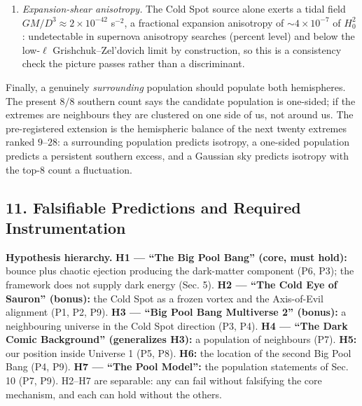 \documentclass[
]{article}
\begin{document}
\begin{enumerate}
  the sign convention (hot attractive) gives \((290°, -24°)\), \(19°\)
  from CF4. The model therefore either fails this test or requires hot
  extremes to be the attractive ones, which is the unspecified sign
  mechanism noted under the table above. We pre-register the test as:
  once the sign mechanism is fixed \emph{by the model}, the predicted
  direction must fall within \(30°\) of the measured bulk flow; the sign
  may not be chosen from the data.
\item
  \emph{Expansion-shear anisotropy.} The Cold Spot source alone exerts a
  tidal field \(GM/D^3 \approx 2\times10^{-42}\) s\(^{-2}\), a
  fractional expansion anisotropy of \(\sim\!4\times10^{-7}\) of
  \(H_0^2\): undetectable in supernova anisotropy searches (percent
  level) and below the low-\(\ell\) Grishchuk--Zel'dovich limit by
  construction, so this is a consistency check the picture passes rather
  than a discriminant.
\end{enumerate}

Finally, a genuinely \emph{surrounding} population should populate both
hemispheres. The present \(8/8\) southern count says the candidate
population is one-sided; if the extremes are neighbours they are
clustered on one side of us, not around us. The pre-registered extension
is the hemispheric balance of the next twenty extremes ranked
\(9\)--\(28\): a surrounding population predicts isotropy, a one-sided
population predicts a persistent southern excess, and a Gaussian sky
predicts isotropy with the top-8 count a fluctuation.

\hypertarget{falsifiable-predictions-and-required-instrumentation}{%
\subsection{\texorpdfstring{\textbf{11. Falsifiable Predictions and
Required
Instrumentation}}{11. Falsifiable Predictions and Required Instrumentation}}\label{falsifiable-predictions-and-required-instrumentation}}

\textbf{Hypothesis hierarchy.} \textbf{H1 --- ``The Big Pool Bang''
(core, must hold):} bounce plus chaotic ejection producing the
dark-matter component (P6, P3); the framework does not supply dark
energy (Sec. 5). \textbf{H2 --- ``The Cold Eye of Sauron'' (bonus):} the
Cold Spot as a frozen vortex and the Axis-of-Evil alignment (P1, P2,
P9). \textbf{H3 --- ``Big Pool Bang Multiverse 2'' (bonus):} a
neighbouring universe in the Cold Spot direction (P3, P4). \textbf{H4
--- ``The Dark Comic Background'' (generalizes H3):} a population of
neighbours (P7). \textbf{H5:} our position inside Universe 1 (P5, P8).
\textbf{H6:} the location of the second Big Pool Bang (P4, P9).
\textbf{H7 --- ``The Pool Model'':} the population statements of Sec. 10
(P7, P9). H2--H7 are separable: any can fail without falsifying the core
mechanism, and each can hold without the others.
\end{document}
